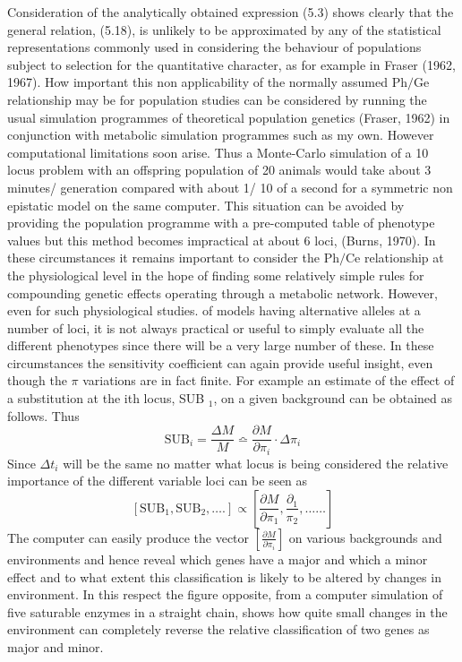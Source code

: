 Consideration of the analytically obtained expression (5.3) shows clearly that the general relation, (5.18), is unlikely to be approximated by any of the statistical representations commonly used in considering the behaviour of populations subject to selection for the quantitative character, as for example in Fraser (1962, 1967). How important this non applicability of the normally assumed $\mathrm{Ph} / \mathrm{Ge}$ relationship may be for population studies can be considered by running the usual simulation programmes of theoretical population genetics (Fraser, 1962) in conjunction with metabolic simulation programmes such as my own. However computational limitations soon arise. Thus a Monte-Carlo simulation of a 10 locus problem with an offspring population of 20 animals would take about 3 minutes/ generation compared with about 1/ 10 of a second for a symmetric non epistatic model on the same computer. This situation can be avoided by providing the population programme with a pre-computed table of phenotype values but this method becomes impractical at about 6 loci, (Burns, 1970). In these circumstances it remains important to consider the $\mathrm{Ph} / \mathrm{Ce}$ relationship at the physiological level in the hope of finding some relatively simple rules for compounding genetic effects operating through a metabolic network. However, even for such physiological studies. of models having alternative alleles at a number of loci, it is not always practical or useful to simply evaluate all the different phenotypes since there will be a very large number of these. In these circumstances the sensitivity coefficient can again provide useful insight, even though the $\pi$ variations are in fact finite. For example an estimate of the effect of a substitution at the ith locus, SUB $_1$, on a given background can be obtained as follows. Thus
%
$$
\mathrm{SUB}_i=\frac{\Delta M}{M} \bumpeq \frac{\partial M}{\partial \pi_i} \cdot \Delta \pi_i
$$
%
Since $\Delta t_{i}$ will be the same no matter what locus is being considered the relative importance of the different variable loci can be seen as
%
$$
\left[\mathrm{SUB}_{1}, \mathrm{SUB}_{2}, \ldots .\right] \propto \left[\frac{\partial M}{\partial \pi_{1}}, \frac{\partial_{1}}{\pi_{2}}, \ldots \ldots\right]
$$
%
The computer can easily produce the vector $\left[\frac{\partial M}{\partial{\pi_i}}\right]$ on various backgrounds and environments and hence reveal which genes have a major and which a minor effect and to what extent this classification is likely to be altered by changes in environment. In this respect the figure opposite, from a computer simulation of five saturable enzymes in a straight chain, shows how quite small changes in the environment can completely reverse the relative classification of two genes as major and minor.

